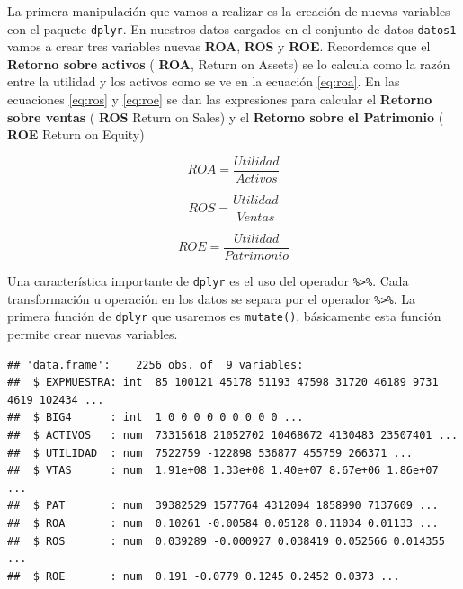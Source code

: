 \documentclass[]{book}
\newenvironment{Shaded}{\begin{snugshade}}{\end{snugshade}}
\newcommand{\KeywordTok}[1]{\textcolor[rgb]{0.13,0.29,0.53}{\textbf{#1}}}
\newcommand{\DataTypeTok}[1]{\textcolor[rgb]{0.13,0.29,0.53}{#1}}
\newcommand{\StringTok}[1]{\textcolor[rgb]{0.31,0.60,0.02}{#1}}
\newcommand{\OperatorTok}[1]{\textcolor[rgb]{0.81,0.36,0.00}{\textbf{#1}}}
\newcommand{\NormalTok}[1]{#1}
\begin{document}
La primera manipulación que vamos a realizar es la creación de nuevas
variables con el paquete \texttt{dplyr}. En nuestros datos cargados en
el conjunto de datos \texttt{datos1} vamos a crear tres variables nuevas
\textbf{ROA}, \textbf{ROS} y \textbf{ROE}. Recordemos que el
\textbf{Retorno sobre activos} ( \textbf{ROA}, Return on Assets) se lo
calcula como la razón entre la utilidad y los activos como se ve en la
ecuación \eqref{eq:roa}. En las ecuaciones \eqref{eq:ros} y \eqref{eq:roe} se
dan las expresiones para calcular el \textbf{Retorno sobre ventas} (
\textbf{ROS} Return on Sales) y el \textbf{Retorno sobre el Patrimonio}
( \textbf{ROE} Return on Equity)

\begin{equation} 
  ROA = \dfrac{Utilidad}{Activos}
  \label{eq:roa}
\end{equation}

\begin{equation} 
  ROS = \dfrac{Utilidad}{Ventas}
  \label{eq:ros}
\end{equation}

\begin{equation} 
  ROE = \dfrac{Utilidad}{Patrimonio}
  \label{eq:roe}
\end{equation}

Una característica importante de \texttt{dplyr} es el uso del operador
\texttt{\%\textgreater{}\%}. Cada transformación u operación en los
datos se separa por el operador \texttt{\%\textgreater{}\%}. La primera
función de \texttt{dplyr} que usaremos es \texttt{mutate()}, básicamente
esta función permite crear nuevas variables.

\begin{Shaded}
\end{Shaded}

\begin{verbatim}
## 'data.frame':    2256 obs. of  9 variables:
##  $ EXPMUESTRA: int  85 100121 45178 51193 47598 31720 46189 9731 4619 102434 ...
##  $ BIG4      : int  1 0 0 0 0 0 0 0 0 0 ...
##  $ ACTIVOS   : num  73315618 21052702 10468672 4130483 23507401 ...
##  $ UTILIDAD  : num  7522759 -122898 536877 455759 266371 ...
##  $ VTAS      : num  1.91e+08 1.33e+08 1.40e+07 8.67e+06 1.86e+07 ...
##  $ PAT       : num  39382529 1577764 4312094 1858990 7137609 ...
##  $ ROA       : num  0.10261 -0.00584 0.05128 0.11034 0.01133 ...
##  $ ROS       : num  0.039289 -0.000927 0.038419 0.052566 0.014355 ...
##  $ ROE       : num  0.191 -0.0779 0.1245 0.2452 0.0373 ...
\end{verbatim}
\end{document}
